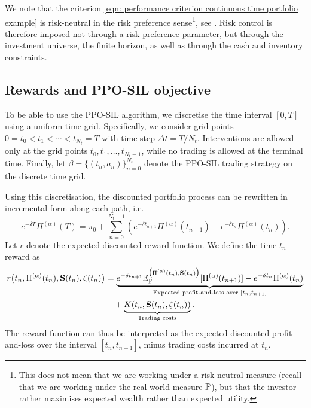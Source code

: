 We note that the criterion \eqref{eqn: performance criterion continuous time portfolio example} is risk-neutral in the risk preference sense\footnote{This does not mean that we are working under a risk-neutral measure (recall that we are working under the real-world measure $\mathbb{P}$), but that the investor rather maximises expected wealth rather than expected utility.}, see \cite{buehler2022deep}. Risk control is therefore imposed not through a risk preference parameter, but through the investment universe, the finite horizon, as well as through the cash and inventory constraints.

\subsection{Rewards and PPO-SIL objective}
To be able to use the PPO-SIL algorithm, we discretise the time interval $[0,T]$ using a uniform time grid. Specifically, we consider grid points $0=t_0 < t_1 < \cdots < t_{N_t}=T$ with time step $\Delta t = T/N_t$. Interventions are allowed only at the grid points $t_0, t_1, \ldots, t_{N_t-1}$, while no trading is allowed at the terminal time. Finally, let $\beta=\{(t_n, a_n)\}_{n=0}^{N_t}$ denote the PPO-SIL trading strategy on the discrete time grid.

Using this discretisation, the discounted portfolio process can be rewritten in incremental form along each path, i.e.
\begin{equation}
    e^{-\delta T}\Pi^{(\alpha)}(T) = \pi_0 + \sum_{n=0}^{N_t-1} \left(e^{- \delta t_{n+1}}\Pi^{(\alpha)}(t_{n+1}) - e^{-\delta t_{n}}\Pi^{(\alpha)}(t_n) \right).
    \label{eqn: portfolio incremental formula}
\end{equation}
Let $r$ denote the expected discounted reward function. We define the time-$t_n$ reward as
\begin{align*}
    r\big(t_n,\Pi^{(\alpha)}(t_n), \mathbf{S}(t_{n}),\zeta(t_n)\big) &= \underbrace{e^{-\delta t_{n+1}} \mathbb{E}_{\mathbb{P}}^{\big(\Pi^{(\alpha)}(t_n), \mathbf{S}(t_{n})\big)}[\Pi^{(\alpha)}(t_{n+1})] - e^{-\delta t_{n}}\Pi^{(\alpha)}(t_n)}_{\text{Expected profit-and-loss over } [t_n,t_{n+1}]} 
    \\& \quad + \underbrace{K(t_n, \mathbf{S}(t_n), \zeta(t_n))}_{\text{Trading costs}}.
\end{align*}
The reward function can thus be interpreted as the expected discounted profit-and-loss over the interval $[t_n,t_{n+1}]$, minus trading costs incurred at $t_n$.

